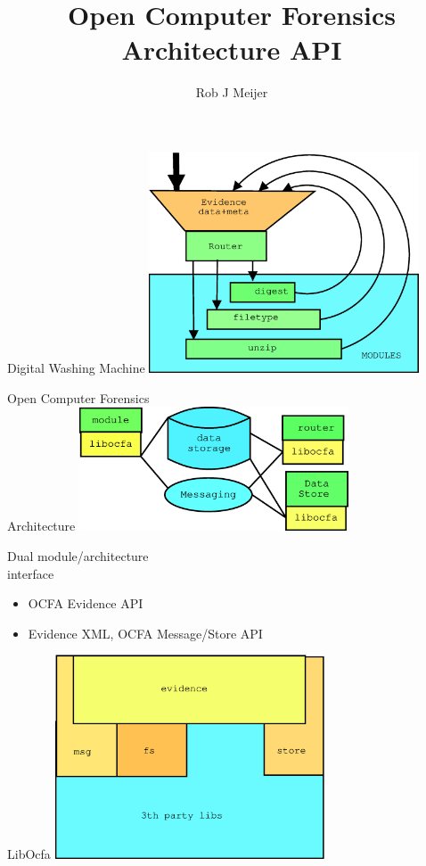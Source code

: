 \documentclass[pdf,contemporain,slideColor,colorBG,accumulate,nototal,capsules]{prosper}
\title{Open Computer Forensics Architecture API}
\author{Rob J Meijer}
\begin{document}
\maketitle
\begin{slide}{Digital Washing Machine}
\includegraphics[width=8cm]{dia7.eps}
\end{slide}
\begin{slide}{Open Computer Forensics \\
Architecture}
\includegraphics[width=8cm]{dia1.eps}
\end{slide}
\begin{slide}{Dual module/architecture \\
interface}
\begin{itemize}
\item OCFA Evidence API
\item Evidence XML, OCFA Message/Store API
\end{itemize}
\end{slide}
\begin{slide}{LibOcfa}
\includegraphics[width=8cm]{dia2.eps}
\end{slide}
\end{document}

